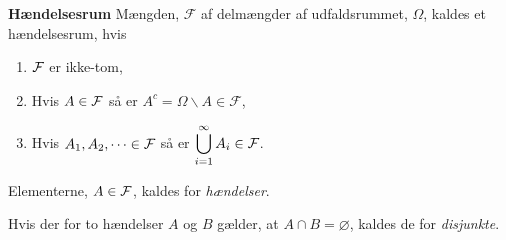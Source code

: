 \begin{defn}\textbf{Hændelsesrum}
\newline
    Mængden, $\mathcal{F}$ af delmængder af udfaldsrummet, $\Omega$, kaldes et hændelsesrum, hvis
    \begin{enumerate}
        \item $\mathcal{F}$ er ikke-tom,
        \item Hvis $A\in\mathcal{F}$ så er $A^c=\Omega\backslash A \in \mathcal{F}$,
        \item Hvis $A_1, A_2,\dots\in \mathcal{F}$ så er $\displaystyle \bigcup_{i=1}^\infty A_i\in\mathcal{F}$.
    \end{enumerate}
Elementerne, $A\in \mathcal{F}$, kaldes for \textit{hændelser}.
\end{defn}


Hvis der for to hændelser $A$ og $B$ gælder, at $A \cap B = \varnothing$, kaldes de for \textit{disjunkte}.







